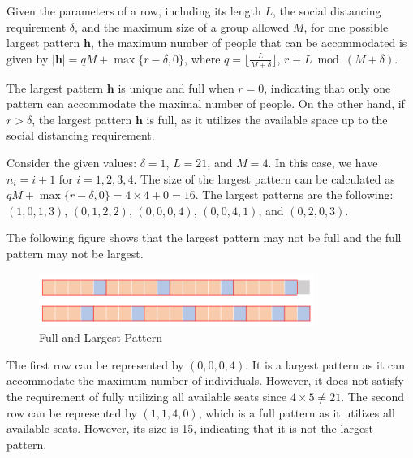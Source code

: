 \begin{prop}\label{lem_pattern}
Given the parameters of a row, including its length $L$, the social distancing requirement $\delta$, and the maximum size of a group allowed $M$, for one possible largest pattern $\bm{h}$, the maximum number of people that can be accommodated is given by $|\bm{h}| = qM + \max\{r-\delta, 0\}$, where $q = \lfloor \frac{L}{M + \delta} \rfloor$, $r \equiv L \bmod (M + \delta)$. 
\end{prop}


The largest pattern $\bm{h}$ is unique and full when $r = 0$, indicating that only one pattern can accommodate the maximal number of people. On the other hand, if $r > \delta$, the largest pattern $\bm{h}$ is full, as it utilizes the available space up to the social distancing requirement.


\begin{example}
Consider the given values: $\delta = 1$, $L = 21$, and $M = 4$. In this case, we have $n_i = i + 1$ for $i = 1, 2, 3, 4$. The size of the largest pattern can be calculated as $qM + \max\{r-\delta, 0\} = 4 \times 4 + 0 = 16$. The largest patterns are the following: $(1, 0, 1, 3)$, $(0, 1, 2, 2)$, $(0, 0, 0, 4)$, $(0, 0, 4, 1)$, and $(0, 2, 0, 3)$.

The following figure shows that the largest pattern may not be full and the full pattern may not be largest.
\begin{figure}[ht]
    \centering
        \includegraphics[width=0.8\textwidth]{./Figures/full_largest.png}
    \caption{Full and Largest Pattern}
\end{figure}

The first row can be represented by $(0, 0, 0, 4)$. It is a largest pattern as it can accommodate the maximum number of individuals. However, it does not satisfy the requirement of fully utilizing all available seats since $4 \times 5 \neq 21$.
The second row can be represented by $(1, 1, 4, 0)$, which is a full pattern as it utilizes all available seats. However, its size is 15, indicating that it is not the largest pattern.
\end{example}


\newpage